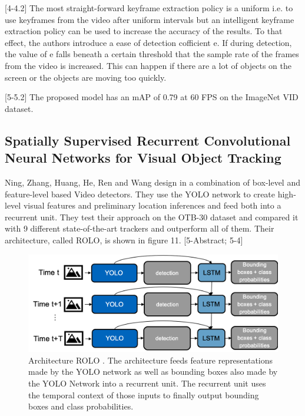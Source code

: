 \documentclass[conference]{IEEEtran}
\begin{document}
[4-4.2] The most straight-forward keyframe extraction policy is a uniform i.e. to use keyframes from the video after uniform intervals but an intelligent keyframe extraction policy can be used to increase the accuracy of the results. To that effect, the authors introduce a ease of detection cofficient e. If during detection, the value of e falls beneath a certain threshold that the sample rate of the frames from the video is increased. This can happen if there are a lot of objects on the screen or the objects are moving too quickly. \newline

[5-5.2] The proposed model has an mAP of 0.79 at 60 FPS on the ImageNet VID dataset. \newline

\subsection{Spatially Supervised Recurrent Convolutional Neural Networks for Visual Object Tracking \cite{b5}}
Ning, Zhang, Huang, He, Ren and Wang design in \cite{b5} a combination of box-level and feature-level based Video detectors. They use the YOLO\cite{b26} network to create high-level visual features and preliminary location inferences and feed both into a recurrent unit. They test their approach on the OTB-30 dataset \cite{b28} and compared it with 9 different state-of-the-art trackers and outperform all of them. Their architecture, called ROLO, is shown in figure 11. [5-Abstract; 5-4] 

\begin{figure} [h]
\includegraphics[width=\columnwidth]{ROLO}
\caption{Architecture ROLO \cite{b5}. The architecture feeds feature representations made by the YOLO network as well as bounding boxes also made by the YOLO Network into a recurrent unit. The recurrent unit uses the temporal context of those inputs to finally output bounding boxes and class probabilities.}
\end{figure}
\end{document}

